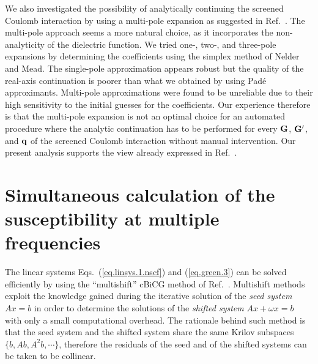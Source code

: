 \documentclass[twocolumn,prb,showpacs,superscriptaddress]{revtex4}
\def\w{\omega}
\def\q{{\bf q}}
\def\G{{\bf G}}
\def\Gp{{\bf G^\prime}}
\begin{document}
We also investigated the possibility of analytically continuing
the screened Coulomb interaction by using a multi-pole expansion
as suggested in Ref.\ . The multi-pole approach
seems a more natural choice, as it incorporates the non-analyticity
of the dielectric function. We tried one-, two-, and three-pole
expansions by determining the coefficients using the simplex 
method of Nelder and Mead.\cite{nelder-mead}
The single-pole approximation appears robust but the quality
of the real-axis continuation is poorer than what we obtained
by using Pad\'e approximants. Multi-pole approximations were found
to be unreliable due to their high sensitivity to the initial guesses 
for the coefficients.
Our experience therefore is that the multi-pole expansion is not an optimal 
choice for an automated procedure where the analytic continuation has to be
performed for every $\G$, $\Gp$, and $\q$ of the screened Coulomb 
interaction without manual intervention. Our present analysis supports the view 
already expressed in Ref.\ .

\section{Simultaneous calculation of the susceptibility at multiple frequencies}\label{app.multishift}

The linear systems Eqs.\ (\ref{eq.linsys.1.nscf}) and (\ref{eq.green.3})
can be solved efficiently by using the ``multishift'' 
cBiCG method of Ref.~.
Multishift methods exploit the knowledge gained during the iterative
solution of the {\it seed system} $Ax=b$ in order to determine the solutions 
of the {\it shifted system} $Ax+\w x=b$ with only a small computational overhead.
The rationale behind such method is that the seed system and the
shifted system share the same Krilov subspaces $\{b,Ab,A^2b,\cdots\}$,
therefore the residuals of the seed and of the shifted
systems can be taken to be collinear.\cite{frommer}
\end{document}
